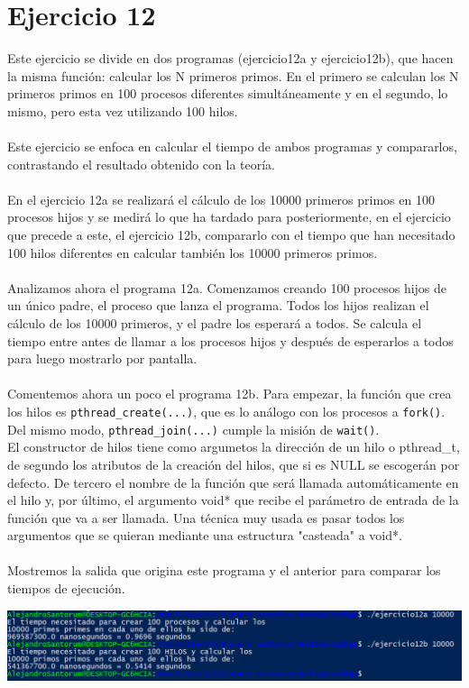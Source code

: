 \documentclass[12pt]{article}
\begin{document}
\section{Ejercicio 12}
Este ejercicio se divide en dos programas (ejercicio12a y ejercicio12b), que hacen la misma función: calcular los N primeros primos. En el primero se calculan los N primeros primos en 100 procesos diferentes simultáneamente y en el segundo, lo mismo, pero esta vez utilizando 100 hilos.\\\\
Este ejercicio se enfoca en calcular el tiempo de ambos programas y compararlos, contrastando el resultado obtenido con la teoría.\\\\
En el ejercicio 12a se realizará el cálculo de los 10000 primeros primos en 100 procesos hijos y se medirá lo que ha tardado para posteriormente, en el ejercicio que precede a este, el ejercicio 12b, compararlo con el tiempo que han necesitado 100 hilos diferentes en calcular también los 10000 primeros primos.\\\\
Analizamos ahora el programa 12a. Comenzamos creando 100 procesos hijos de un único padre, el proceso que lanza el programa. Todos los hijos realizan el cálculo de los 10000 primeros, y el padre los esperará a todos. Se calcula el tiempo entre antes de llamar a los procesos hijos y después de esperarlos a todos para luego mostrarlo por pantalla.\\\\
Comentemos ahora un poco el programa 12b. Para empezar, la función que crea los hilos es \texttt{pthread\_create(...)}, que es lo análogo con los procesos a \texttt{fork()}. Del mismo modo, \texttt{pthread\_join(...)} cumple la misión de \texttt{wait()}.\\ El constructor de hilos tiene como argumetos la dirección de un hilo o pthread\_t, de segundo los atributos de la creación del hilos, que si es NULL se escogerán por defecto. De tercero el nombre de la función que será llamada automáticamente en el hilo y, por último, el argumento void* que recibe el parámetro de entrada de la función que va a ser llamada. Una técnica muy usada es pasar todos los argumentos que se quieran mediante una estructura "casteada" a void*.\\\\
Mostremos la salida que origina este programa y el anterior para comparar los tiempos de ejecución.
\begin{center}
	\includegraphics[scale=0.9]{ej12aY12b.PNG}
\end{center}
\end{document}
